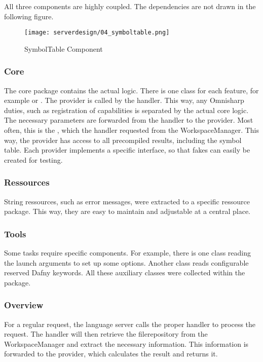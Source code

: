 All three components are highly coupled. The dependencies are not drawn in the following figure.


\begin{figure}[H]
    \centering
    \texttt{[image: serverdesign/04\_symboltable.png]}
    \caption{SymbolTable Component}
    \label{fig:server_st}
\end{figure}

\subsubsection {Core}
The core package contains the actual logic. There is one class for each feature, for example  or . The provider is called by the handler. This way, any Omnisharp duties, such as registration of capabilities is separated by the actual core logic. The necessary parameters are forwarded from the handler to the provider. Most often, this is the , which the handler requested from the WorkspaceManager. This way, the provider has access to all precompiled results, including the symbol table. Each provider implements a specific interface, so that fakes can easily be created for testing.


\subsubsection{Ressources}
String ressources, such as error messages, were extracted to a specific ressource package. This way, they are easy to maintain and adjustable at a central place.

\subsubsection{Tools}
Some tasks require specific components. For example, there is one class reading the launch arguments to set up some options. Another class reads configurable reserved Dafny keywords. All these auxiliary classes were collected within the  package.

\subsubsection{Overview}
For a regular request, the language server calls the proper handler to process the request. The handler will then retrieve the filerepository from the WorkspaceManager and extract the necessary information. This information is forwarded to the provider, which calculates the result and returns it.

